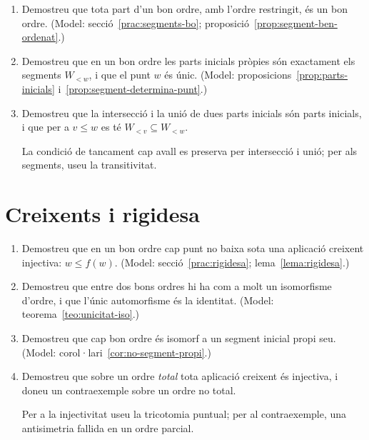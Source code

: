 \begin{enumerate}[resume]
  \item Demostreu que tota part d'un bon ordre, amb l'ordre restringit, és un bon ordre. (Model: secció~\ref{prac:segments-bo}; proposició~\ref{prop:segment-ben-ordenat}.)

  \item Demostreu que en un bon ordre les parts inicials pròpies són exactament els segments \(W_{<w}\), i que el punt \(w\) és únic. (Model: proposicions~\ref{prop:parts-inicials} i~\ref{prop:segment-determina-punt}.)

  \item Demostreu que la intersecció i la unió de dues parts inicials són parts inicials, i que per a \(v\le w\) es té \(W_{<v}\subseteq W_{<w}\). \begin{indicacio}La condició de tancament cap avall es preserva per intersecció i unió; per als segments, useu la transitivitat.\end{indicacio}
\end{enumerate}

\section{Creixents i rigidesa}

\begin{enumerate}[resume]
  \item Demostreu que en un bon ordre cap punt no baixa sota una aplicació creixent injectiva: \(w\le f(w)\). (Model: secció~\ref{prac:rigidesa}; lema~\ref{lema:rigidesa}.)

  \item Demostreu que entre dos bons ordres hi ha com a molt un isomorfisme d'ordre, i que l'únic automorfisme és la identitat. (Model: teorema~\ref{teo:unicitat-iso}.)

  \item Demostreu que cap bon ordre és isomorf a un segment inicial propi seu. (Model: corol·lari~\ref{cor:no-segment-propi}.)

  \item Demostreu que sobre un ordre \emph{total} tota aplicació creixent és injectiva, i doneu un contraexemple sobre un ordre no total. \begin{indicacio}Per a la injectivitat useu la tricotomia puntual; per al contraexemple, una antisimetria fallida en un ordre parcial.\end{indicacio}
\end{enumerate}


